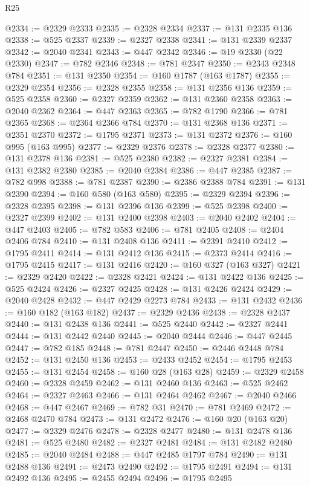 \begin{lexlean}{R25}
\begin{coremodule}
@2334 := @2329 @2333
@2335 := @2328 @2334
@2337 := @131 @2335 @136
@2338 := @525 @2337
@2339 := @2327 @2338
@2341 := @131 @2339 @2337
@2342 := @2040 @2341
@2343 := @447 @2342
@2346 := @19 @2330 (@22 @2330)
@2347 := @782 @2346
@2348 := @781 @2347
@2350 := @2343 @2348 @784
@2351 := @131 @2350
@2354 := @160 @1787 (@163 @1787)
@2355 := @2329 @2354
@2356 := @2328 @2355
@2358 := @131 @2356 @136
@2359 := @525 @2358
@2360 := @2327 @2359
@2362 := @131 @2360 @2358
@2363 := @2040 @2362
@2364 := @447 @2363
@2365 := @782 @1790
@2366 := @781 @2365
@2368 := @2364 @2366 @784
@2370 := @131 @2368 @136
@2371 := @2351 @2370
@2372 := @1795 @2371
@2373 := @131 @2372
@2376 := @160 @995 (@163 @995)
@2377 := @2329 @2376
@2378 := @2328 @2377
@2380 := @131 @2378 @136
@2381 := @525 @2380
@2382 := @2327 @2381
@2384 := @131 @2382 @2380
@2385 := @2040 @2384
@2386 := @447 @2385
@2387 := @782 @998
@2388 := @781 @2387
@2390 := @2386 @2388 @784
@2391 := @131 @2390
@2394 := @160 @580 (@163 @580)
@2395 := @2329 @2394
@2396 := @2328 @2395
@2398 := @131 @2396 @136
@2399 := @525 @2398
@2400 := @2327 @2399
@2402 := @131 @2400 @2398
@2403 := @2040 @2402
@2404 := @447 @2403
@2405 := @782 @583
@2406 := @781 @2405
@2408 := @2404 @2406 @784
@2410 := @131 @2408 @136
@2411 := @2391 @2410
@2412 := @1795 @2411
@2414 := @131 @2412 @136
@2415 := @2373 @2414
@2416 := @1795 @2415
@2417 := @131 @2416
@2420 := @160 @327 (@163 @327)
@2421 := @2329 @2420
@2422 := @2328 @2421
@2424 := @131 @2422 @136
@2425 := @525 @2424
@2426 := @2327 @2425
@2428 := @131 @2426 @2424
@2429 := @2040 @2428
@2432 := @447 @2429 @2273 @784
@2433 := @131 @2432
@2436 := @160 @182 (@163 @182)
@2437 := @2329 @2436
@2438 := @2328 @2437
@2440 := @131 @2438 @136
@2441 := @525 @2440
@2442 := @2327 @2441
@2444 := @131 @2442 @2440
@2445 := @2040 @2444
@2446 := @447 @2445
@2447 := @782 @185
@2448 := @781 @2447
@2450 := @2446 @2448 @784
@2452 := @131 @2450 @136
@2453 := @2433 @2452
@2454 := @1795 @2453
@2455 := @131 @2454
@2458 := @160 @28 (@163 @28)
@2459 := @2329 @2458
@2460 := @2328 @2459
@2462 := @131 @2460 @136
@2463 := @525 @2462
@2464 := @2327 @2463
@2466 := @131 @2464 @2462
@2467 := @2040 @2466
@2468 := @447 @2467
@2469 := @782 @31
@2470 := @781 @2469
@2472 := @2468 @2470 @784
@2473 := @131 @2472
@2476 := @160 @20 (@163 @20)
@2477 := @2329 @2476
@2478 := @2328 @2477
@2480 := @131 @2478 @136
@2481 := @525 @2480
@2482 := @2327 @2481
@2484 := @131 @2482 @2480
@2485 := @2040 @2484
@2488 := @447 @2485 @1797 @784
@2490 := @131 @2488 @136
@2491 := @2473 @2490
@2492 := @1795 @2491
@2494 := @131 @2492 @136
@2495 := @2455 @2494
@2496 := @1795 @2495

\end{coremodule}
\end{lexlean}
